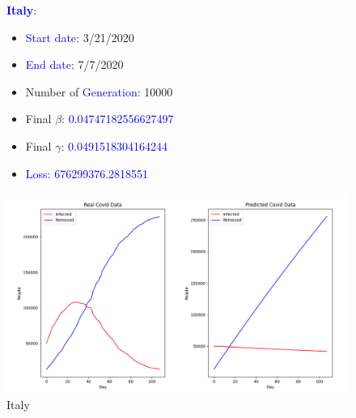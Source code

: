 \documentclass[a4paper]{article}
\begin{document}
     \begin{figure}[ht]
    \centering
    \textbf{\textcolor{blue}{Italy}}: 
    \begin{itemize}
        \item \textcolor{blue}{Start date}: 3/21/2020
        \item \textcolor{blue}{End date}: 7/7/2020
        \item Number of \textcolor{blue}{Generation}: 10000
        \item Final $\beta$: \textcolor{blue}{0.04747182556627497}
        \item Final $\gamma$: \textcolor{blue}{0.0491518304164244}
        \item \textcolor{blue}{Loss}: \textcolor{blue}{676299376.2818551}
    \end{itemize}
    \includegraphics[width= \linewidth]{ex5-plot/Italy.png}
    \caption{Italy}
     \end{figure}
     
\end{document}
